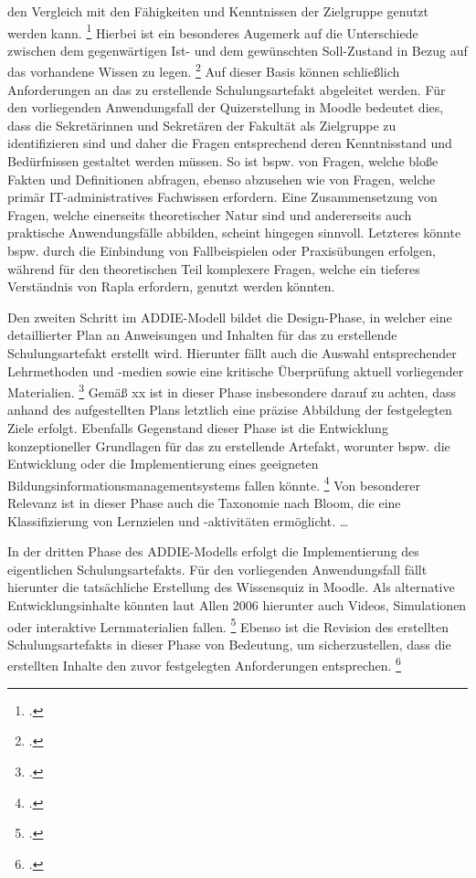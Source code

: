den Vergleich mit den Fähigkeiten und Kenntnissen der Zielgruppe genutzt werden kann.
\footcite[Vgl.][436]{allenOverviewEvolutionADDIE2006}
Hierbei ist ein besonderes Augemerk auf die Unterschiede zwischen dem gegenwärtigen Ist- und dem gewünschten Soll-Zustand in Bezug auf das vorhandene Wissen zu legen.
\footcite[Vgl.][436]{allenOverviewEvolutionADDIE2006}
Auf dieser Basis können schließlich Anforderungen an das zu erstellende Schulungsartefakt abgeleitet werden.
Für den vorliegenden Anwendungsfall der Quizerstellung in Moodle bedeutet dies, dass die Sekretärinnen und Sekretären
der Fakultät als Zielgruppe zu identifizieren sind und daher die Fragen entsprechend deren Kenntnisstand und Bedürfnissen gestaltet werden müssen.
So ist bspw. von Fragen, welche bloße Fakten und Definitionen abfragen, ebenso abzusehen wie von Fragen, welche
primär IT-administratives Fachwissen erfordern. Eine Zusammensetzung von Fragen, welche
einerseits theoretischer Natur sind und andererseits auch praktische Anwendungsfälle abbilden, scheint hingegen sinnvoll.
Letzteres könnte bspw. durch die Einbindung von Fallbeispielen oder Praxisübungen erfolgen, während für den
theoretischen Teil komplexere Fragen, welche ein tieferes Verständnis von Rapla erfordern, genutzt werden könnten.

Den zweiten Schritt im \ac{ADDIE}-Modell bildet die Design-Phase, in welcher eine detaillierter Plan an Anweisungen und Inhalten für das zu erstellende Schulungsartefakt erstellt wird.
Hierunter fällt auch die Auswahl entsprechender Lehrmethoden und -medien sowie eine kritische Überprüfung aktuell vorliegender Materialien.
\footcite[Vgl.][436]{allenOverviewEvolutionADDIE2006} 
Gemäß xx ist in dieser Phase insbesondere darauf zu achten, dass anhand des aufgestellten Plans letztlich eine präzise Abbildung der festgelegten Ziele erfolgt.
Ebenfalls Gegenstand dieser Phase ist die Entwicklung konzeptioneller Grundlagen für das zu erstellende Artefakt, worunter
bspw. die Entwicklung oder die Implementierung eines geeigneten Bildungsinformationsmanagementsystems fallen könnte.
\footcite[Vgl.][436]{allenOverviewEvolutionADDIE2006}
Von besonderer Relevanz
ist in dieser Phase auch die Taxonomie nach Bloom, die eine Klassifizierung von Lernzielen und -aktivitäten ermöglicht.
\dots

In der dritten Phase des \ac{ADDIE}-Modells erfolgt die Implementierung des eigentlichen Schulungsartefakts.
Für den vorliegenden Anwendungsfall fällt hierunter die tatsächliche Erstellung des Wissensquiz in Moodle.
Als alternative Entwicklungsinhalte könnten laut Allen 2006 hierunter auch Videos, Simulationen oder interaktive Lernmaterialien fallen.
\footcite[Vgl.][437]{allenOverviewEvolutionADDIE2006}
Ebenso ist die Revision des erstellten Schulungsartefakts in dieser Phase von Bedeutung, um sicherzustellen, dass die erstellten Inhalte den zuvor festgelegten Anforderungen entsprechen.
\footcite[Vgl.][437]{allenOverviewEvolutionADDIE2006}


